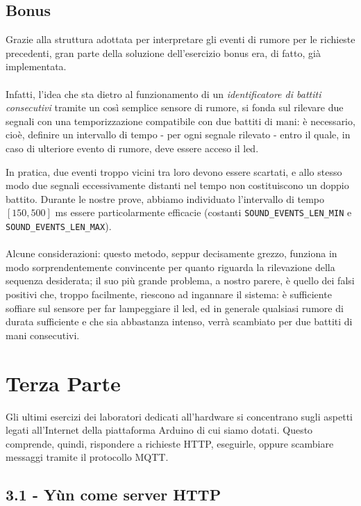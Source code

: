 \documentclass[12pt,a4paper]{article}
\begin{document}
\subsection{Bonus}

Grazie alla struttura adottata per interpretare gli eventi di rumore per le richieste precedenti, gran parte della soluzione dell'esercizio bonus era, di fatto, già implementata.
\\ \\
Infatti, l'idea che sta dietro al funzionamento di un \textit{identificatore di battiti consecutivi} tramite un così semplice sensore di rumore, si fonda sul rilevare due segnali con una temporizzazione compatibile con due battiti di mani: è necessario, cioè, definire un intervallo di tempo - per ogni segnale rilevato - entro il quale, in caso di ulteriore evento di rumore, deve essere acceso il led.

In pratica, due eventi troppo vicini tra loro devono essere scartati, e allo stesso modo due segnali eccessivamente distanti nel tempo non costituiscono un doppio battito. Durante le nostre prove, abbiamo individuato l'intervallo di tempo $[150, 500]$ \si{\milli\second} essere particolarmente efficacie (costanti \verb|SOUND_EVENTS_LEN_MIN| e \verb|SOUND_EVENTS_LEN_MAX|).
\\ \\
Alcune considerazioni: questo metodo, seppur decisamente grezzo, funziona in modo sorprendentemente convincente per quanto riguarda la rilevazione della sequenza desiderata; il suo più grande problema, a nostro parere, è quello dei falsi positivi che, troppo facilmente, riescono ad ingannare il sistema: è sufficiente soffiare sul sensore per far lampeggiare il led, ed in generale qualsiasi rumore di durata sufficiente e che sia abbastanza intenso, verrà scambiato per due battiti di mani consecutivi.

\section{Terza Parte}

Gli ultimi esercizi dei laboratori dedicati all'hardware si concentrano sugli aspetti legati all'Internet della piattaforma Arduino di cui siamo dotati. Questo comprende, quindi, rispondere a richieste HTTP, eseguirle, oppure scambiare messaggi tramite il protocollo MQTT.

\subsection{3.1 - Yùn come server HTTP}
\end{document}
